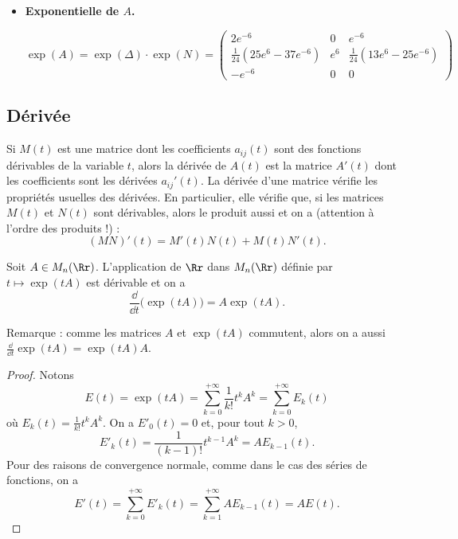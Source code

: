 \documentclass[12pt, class=report,crop=false]{standalone}
\begin{document}
\begin{exemple}
\begin{itemize}
\item \textbf{Exponentielle de $A$.}


$$\exp(A) 
= \exp(\Delta) \cdot \exp(N)
= \begin{pmatrix}
2 e^{-6} & 0 & e^{-6} \\
\frac{1}{24} (25 e^{6} - 37e^{-6}) & e^{6} & \frac{1}{24} (13 e^{6} - 25e^{-6}) \\
-e^{-6} & 0 & 0
\end{pmatrix}
$$
\end{itemize}
\end{exemple}


 
\subsection{Dérivée}

Si $M(t)$ est une matrice dont les coefficients $a_{ij}(t)$ sont des fonctions dérivables de la variable $t$, alors la dérivée de $A(t)$ est la matrice $A'(t)$ dont les coefficients sont les dérivées $a_{ij}'(t)$.
La dérivée d'une matrice vérifie les propriétés usuelles des dérivées. 
En particulier, elle vérifie que, si les matrices $M(t)$ et $N(t)$ sont dérivables, alors le produit aussi et on a (attention à l'ordre des produits !) :
\[(MN)'(t) = M'(t)N(t) + M(t) N'(t) . \]


\begin{proposition}
Soit $A\in M_n(\Rr)$. L'application de $\Rr$ dans
$M_n(\Rr)$ définie par $t \mapsto\exp(tA)$ est dérivable et on a 
$$\frac{\dd}{\dd t} \big( \exp(t A) \big) = A \exp(t A).$$
\end{proposition} 

Remarque : comme les matrices $A$ et $\exp(tA)$ commutent, alors on a aussi
$\frac{\dd}{\dd t} \exp(t A) = \exp(t A) A$.


\begin{proof}
Notons $$E(t)=\exp(tA) = \sum_{k=0}^{+\infty}{\frac{1}{k!}}t^kA^k=\sum_{k=0}^{+\infty}E_k(t)$$
où $E_k(t)={\frac{1}{k!}}t^kA^k$. On a $E'_0(t) = 0$ et, pour tout $k>0$, 
$$E'_k(t)={\frac{1}{(k-1)!}}t^{k-1}A^k=AE_{k-1}(t).$$
Pour des raisons de convergence normale, comme dans le cas des séries de fonctions, on a 
$$E'(t)=\sum_{k=0}^{+\infty}E'_k(t)=\sum_{k=1}^{+\infty}A E_{k-1}(t)=A E(t).$$
\end{proof}
 
 
 
 
 
\end{document}
